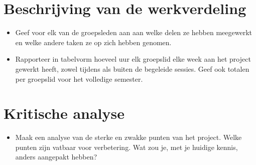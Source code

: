 \documentclass[tt]{penoverslag}
\begin{document}
\section{Beschrijving van de werkverdeling}
\begin{itemize}
\item Geef voor elk van de groepsleden aan aan welke delen ze hebben meegewerkt en welke andere taken ze op zich hebben genomen.
\item Rapporteer in tabelvorm hoeveel uur elk groepslid elke week aan het project gewerkt heeft, zowel tijdens als buiten de begeleide sessies. Geef ook totalen per groepslid voor het volledige semester.
\end{itemize}


\section{Kritische analyse}
\begin{itemize}
\item Maak een analyse van de sterke en zwakke punten van het project. Welke punten zijn vatbaar voor verbetering. Wat zou je, met je huidige kennis, anders aangepakt hebben?
\end{itemize}
\end{document}
